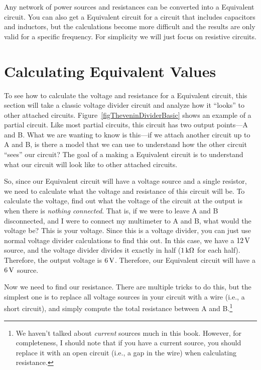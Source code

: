 Any network of power sources and resistances can be converted into a \thev Equivalent circuit.
You can also get a \thev Equivalent circuit for a circuit that includes capacitors and inductors, but the calculations become more difficult and the results are only valid for a specific frequency.
For simplicity we will just focus on resistive circuits.

\section{Calculating \thev  Equivalent Values}



To see how to calculate the voltage and resistance for a \thev Equivalent circuit, this section will take a classic voltage divider circuit and analyze how it ``looks'' to other attached circuits.
Figure~\ref{figTheveninDividerBasic} shows an example of a partial circuit.
Like most partial circuits, this circuit has two output points---A and B.
What we are wanting to know is this---if we attach another circuit up to A and B, is there a model that we can use to understand how the other circuit ``sees'' our circuit?
The goal of a making a \thev Equivalent circuit is to understand what our circuit will look like to other attached circuits.

So, since our \thev Equivalent circuit will have a voltage source and a single resistor, we need to calculate what the voltage and resistance of this circuit will be.
To calculate the voltage, find out what the voltage of the circuit at the output is when there is \emph{nothing connected}.
That is, if we were to leave A and B disconnected, and I were to connect my multimeter to A and B, what would the voltage be?
This is your \thev voltage.
Since this is a voltage divider, you can just use normal voltage divider calculations to find this out.
In this case, we have a $12\,\si{\volt}$ source, and the voltage divider divides it exactly in half ($1\,\si{\kilo\ohm}$ for each half).
Therefore, the output voltage is $6\,\si{\volt}$.  
Therefore, our \thev Equivalent circuit will have a $6\,\si{\volt}$ source.

Now we need to find our \thev resistance.
There are multiple tricks to do this, but the simplest one is to replace all voltage sources in your circuit with a wire (i.e., a short circuit), and simply compute the total resistance between A and B.\footnote{We haven't talked about \emph{current} sources much in this book.  However, for completeness, I should note that if you have a current source, you should replace it with an open circuit (i.e., a gap in the wire) when calculating \thev resistance.}

